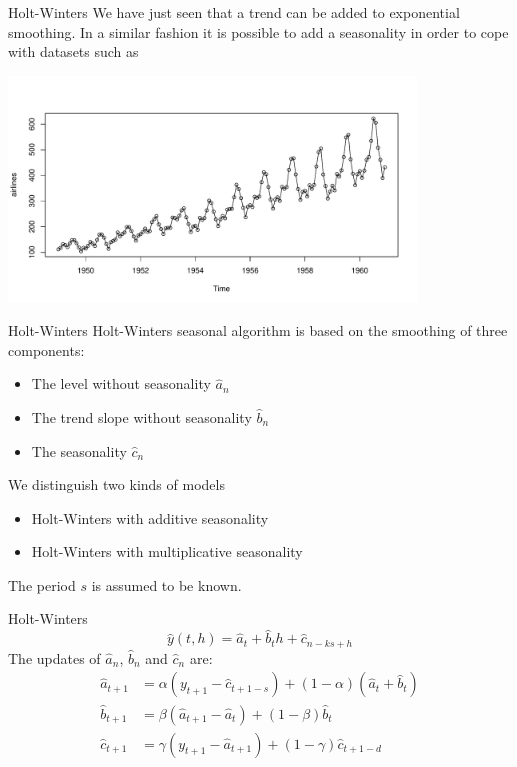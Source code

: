 \documentclass{beamer}
\begin{document}
\begin{frame}{Holt-Winters}
We have just seen that a trend can be added to exponential smoothing. In a similar fashion it is possible to add a seasonality in order to cope with datasets such as
\begin{center}
\includegraphics[height=6cm]{figures/R/airlines}
\end{center}
\end{frame}

\begin{frame}{Holt-Winters}
Holt-Winters seasonal algorithm is based on the smoothing of three components:
\begin{itemize}
	\item The level without seasonality $\hat{a}_n$
	\item The trend slope without seasonality $\hat{b}_n$
	\item The seasonality $\hat{c}_n$
\end{itemize}
\vspace{5mm}
We distinguish two kinds of models
\begin{itemize}
	\item Holt-Winters with additive seasonality
	\item Holt-Winters with multiplicative seasonality
\end{itemize}
The period $s$ is assumed to be known.
\end{frame}

\begin{frame}{Holt-Winters}
$$ \hat{y}(t,h) = \hat{a}_t + \hat{b}_t h + \hat{c}_{n-ks+h}$$
The updates of $\hat{a}_n$, $\hat{b}_n$ and $\hat{c}_n$ are:
\begin{equation*}
  \begin{split}
    \hat{a}_{t+1} &= \alpha (y_{t+1} -\hat{c}_{t+1-s})  + (1 - \alpha)(\hat{a}_{t} + \hat{b}_{t}) \\
    \hat{b}_{t+1} &= \beta (\hat{a}_{t+1} - \hat{a}_{t}) + (1 - \beta)\hat{b}_{t}\\
    \hat{c}_{t+1} &= \gamma (y_{t+1} -\hat{a}_{t+1}) + (1 - \gamma)\hat{c}_{t+1-d}
  \end{split}
\end{equation*}
\end{frame}
\end{document}
